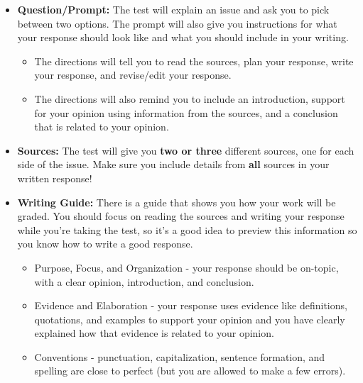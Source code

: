 \documentclass[12pt]{article}
\begin{document}
\vspace{1em}
\begin{tcolorbox}[colframe=black!60, colback=white, 
coltitle=black, colbacktitle=black!15, fonttitle=\bfseries\Large, 
title=What does the Writing Task Look Like?, halign title=center, left=10pt, right=10pt, top=10pt, bottom=15pt]

\begin{itemize}
    \item \textbf{Question/Prompt:} The test will explain an issue and ask you to pick between two options. The prompt will also give you instructions for what your response should look like and what you should include in your writing.
    \begin{itemize}
        \item The directions will tell you to read the sources, plan your response, write your response, and revise/edit your response.
        \item The directions will also remind you to include an introduction, support for your opinion using information from the sources, and a conclusion that is related to your opinion.
    \end{itemize}
    \item \textbf{Sources:} The test will give you \textbf{two or three} different sources, one for each side of the issue. Make sure you include details from \textbf{all} sources in your written response!
    \item \textbf{Writing Guide:} There is a guide that shows you how your work will be graded. You should focus on reading the sources and writing your response while you're taking the test, so it's a good idea to preview this information so you know how to write a good response.
    \begin{itemize}
        \item Purpose, Focus, and Organization - your response should be on-topic, with a clear opinion, introduction, and conclusion. 
        \item Evidence and Elaboration - your response uses evidence like definitions, quotations, and examples to support your opinion and you have clearly explained how that evidence is related to your opinion. 
        \item Conventions - punctuation, capitalization, sentence formation, and spelling are close to perfect (but you are allowed to make a few errors).
    \end{itemize}
    \end{itemize}



\vspace{1em}


\end{tcolorbox}
\end{document}
